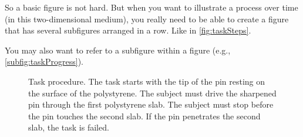So a basic figure is not hard.
But when you want to illustrate a process over time (in this two-dimensional medium), you really need to be able to create a figure that has several subfigures arranged in a row.
Like in \autoref{fig:taskSteps}.

You may also want to refer to a subfigure within a figure (e.g., \autoref{subfig:taskProgress}).

\begin{figure}
\centering %
%
\hspace{-0.035\columnwidth}%
%
\hspace{-0.035\columnwidth}%
%
\hspace{-0.035\columnwidth}%
%
\caption[Task procedure]{%
  Task procedure.   The task starts with the tip of the pin resting on the surface of the polystyrene.  The subject must drive the sharpened pin through the first polystyrene slab.   The subject must stop before the pin touches the second slab.  If the pin penetrates the second slab, the task is failed.
}%
\label{fig:taskSteps}
\end{figure}

